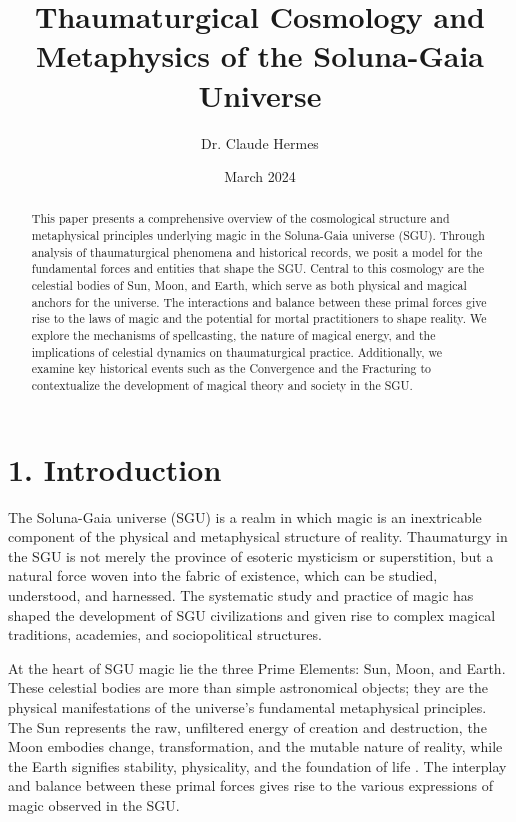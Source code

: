 \documentclass[12pt]{article}
\title{Thaumaturgical Cosmology and Metaphysics of the Soluna-Gaia Universe}
\author{Dr. Claude Hermes}
\date{March 2024}
\begin{document}
\maketitle

\begin{abstract}
This paper presents a comprehensive overview of the cosmological structure and metaphysical principles underlying magic in the Soluna-Gaia universe (SGU). Through analysis of thaumaturgical phenomena and historical records, we posit a model for the fundamental forces and entities that shape the SGU. Central to this cosmology are the celestial bodies of Sun, Moon, and Earth, which serve as both physical and magical anchors for the universe. The interactions and balance between these primal forces give rise to the laws of magic and the potential for mortal practitioners to shape reality. We explore the mechanisms of spellcasting, the nature of magical energy, and the implications of celestial dynamics on thaumaturgical practice. Additionally, we examine key historical events such as the Convergence and the Fracturing to contextualize the development of magical theory and society in the SGU. 
\end{abstract}

\section{1. Introduction}
The Soluna-Gaia universe (SGU) is a realm in which magic is an inextricable component of the physical and metaphysical structure of reality. Thaumaturgy in the SGU is not merely the province of esoteric mysticism or superstition, but a natural force woven into the fabric of existence, which can be studied, understood, and harnessed. The systematic study and practice of magic has shaped the development of SGU civilizations and given rise to complex magical traditions, academies, and sociopolitical structures.

At the heart of SGU magic lie the three Prime Elements: Sun, Moon, and Earth. These celestial bodies are more than simple astronomical objects; they are the physical manifestations of the universe's fundamental metaphysical principles. The Sun represents the raw, unfiltered energy of creation and destruction, the Moon embodies change, transformation, and the mutable nature of reality, while the Earth signifies stability, physicality, and the foundation of life \citep{Valdis2017}. The interplay and balance between these primal forces gives rise to the various expressions of magic observed in the SGU.
\end{document}
